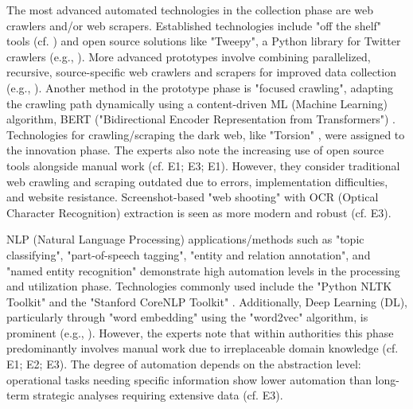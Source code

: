 \documentclass[10pt]{article}
\begin{document}
The most advanced automated technologies in the collection phase are web crawlers and/or web scrapers.
Established technologies include "off the shelf" tools (cf. \cite{Middleton.2020}) and open source
solutions like "Tweepy", a Python library for Twitter crawlers (e.g., \cite{Adewopo.2020}).
More advanced prototypes involve combining parallelized, recursive, source-specific web crawlers and scrapers for improved
data collection (e.g., \cite{Jenkins.2021}). Another method in the prototype phase is
"focused crawling", adapting the crawling path dynamically using a content-driven ML (Machine Learning) algorithm, BERT ("Bidirectional Encoder Representation from Transformers")
\cite{Kuehn.2023}. Technologies for crawling/scraping the dark web, like "Torsion" \cite{Sonawane.2022},
were assigned to the innovation phase. The experts also note the increasing use of open source tools alongside manual work
(cf. E1; E3; E1). However, they consider traditional web crawling and scraping
outdated due to errors, implementation difficulties, and website resistance. Screenshot-based "web shooting" with
OCR (Optical Character Recognition) extraction is seen as more modern and robust (cf. E3).

NLP (Natural Language Processing) applications/methods such as "topic classifying", "part-of-speech tagging", "entity and relation annotation", and "named entity recognition"
demonstrate high automation levels in the processing and utilization phase. Technologies commonly used include
the "Python NLTK Toolkit" \cite{Hubbard.2022} and the "Stanford CoreNLP Toolkit" \cite{Middleton.2020}.
Additionally, Deep Learning (DL), particularly through "word embedding" using the "word2vec" algorithm, is prominent
(e.g., \cite{Bai.2020}). However, the experts note that within authorities this phase predominantly involves manual work due to irreplaceable domain knowledge
(cf. E1; E2; E3). The degree of automation depends on the abstraction level:
operational tasks needing specific information show lower automation than long-term strategic analyses requiring
extensive data (cf. E3).
\end{document}
